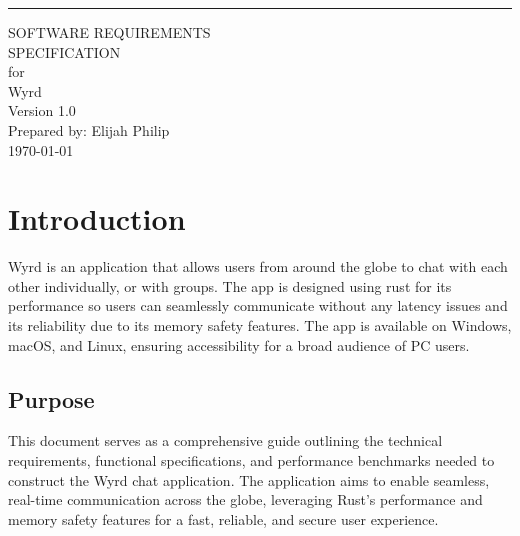 \documentclass{scrreprt}
\date{}
\def\myversion{1.0 }
\begin{document}
\begin{flushright}
    \rule{16cm}{5pt}\vskip1cm
    \begin{bfseries}
        \Huge{SOFTWARE REQUIREMENTS\\ SPECIFICATION}\\
        \vspace{1.5cm}
        for\\
        \vspace{1.5cm}
        Wyrd\\
        \vspace{1.5cm}
        \LARGE{Version \myversion}\\
        \vspace{1.5cm}
        Prepared by: Elijah Philip\\
        \today\\
    \end{bfseries}
\end{flushright}

\tableofcontents

\chapter{Introduction}
Wyrd is an application that allows users from around the globe 
to chat with each other individually, or with groups. The app is designed using rust for its performance 
so users can seamlessly communicate without any latency issues 
and its reliability due to its memory safety features. The app is available on Windows, macOS, and Linux, ensuring accessibility for a broad audience of PC users.
\section{Purpose}
This document serves as a comprehensive guide outlining the technical requirements, 
functional specifications, and performance benchmarks needed to construct the Wyrd chat application. 
The application aims to enable seamless, real-time communication across the globe, leveraging Rust’s 
performance and memory safety features for a fast, reliable, and secure user experience.
\end{document}
